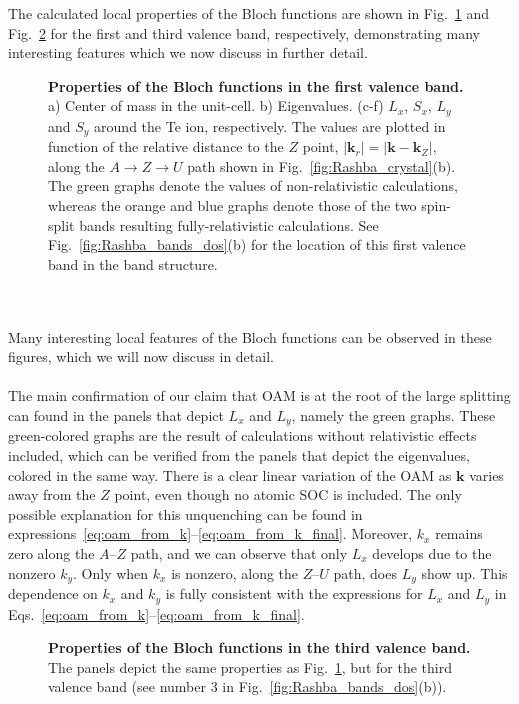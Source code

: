 The calculated local properties of the Bloch functions are shown in Fig.~\ref{fig:Rashba_oamvseigvalv1} and Fig.~\ref{fig:Rashba_oamvseigvalv2} for the first and third valence band, respectively, demonstrating many interesting features which we now discuss in further detail.
\begin{figure}
	\centering
{}
\caption{\label{fig:Rashba_oamvseigvalv1}{\bf Properties of the Bloch functions in the first valence band.} a) Center of mass in the unit-cell. b) Eigenvalues. (c-f) $L_x$, $S_x$, $L_y$ and $S_y$ around the Te ion, respectively. The values are plotted in function of the relative distance to the $Z$ point, $|\bm{k}_r| = |\bm{k} - \bm{k}_Z|$, along the $A \rightarrow Z \rightarrow U$ path shown in Fig.~\ref{fig:Rashba_crystal}(b). The green graphs denote the values of non-relativistic calculations, whereas the orange and blue graphs denote those of the two spin-split bands resulting fully-relativistic calculations. See Fig.~\ref{fig:Rashba_bands_dos}(b) for the location of this first valence band in the band structure.}
\end{figure}
\\\\
Many interesting local features of the Bloch functions can be observed in these figures, which we will now discuss in detail.
\\\\
The main confirmation of our claim that OAM is at the root of the large splitting can found in the panels that depict $L_x$ and $L_y$, namely the green graphs. These green-colored graphs are the result of calculations without relativistic effects included, which can be verified from the panels that depict the eigenvalues, colored in the same way.
There is a clear linear variation of the OAM as $\bm k$ varies away from the $Z$ point, even though no atomic SOC is included.
The only possible explanation for this unquenching can be found in expressions~\eqref{eq:oam_from_k}--\eqref{eq:oam_from_k_final}.
Moreover, $k_x$ remains zero along the $A$--$Z$ path, and we can observe that only $L_x$ develops due to the nonzero $k_y$. Only when $k_x$ is nonzero, along the $Z$--$U$ path, does $L_y$ show up. This dependence on $k_x$ and $k_y$ is fully consistent with the expressions for $L_x$ and $L_y$ in Eqs.~\eqref{eq:oam_from_k}--\eqref{eq:oam_from_k_final}.
\begin{figure}
	\centering
{}
\caption{\label{fig:Rashba_oamvseigvalv2}{\bf Properties of the Bloch functions in the third valence band.} The panels depict the same properties as Fig.~\ref{fig:Rashba_oamvseigvalv1}, but for the third valence band (see number 3 in Fig.~\ref{fig:Rashba_bands_dos}(b)).}
\end{figure}
